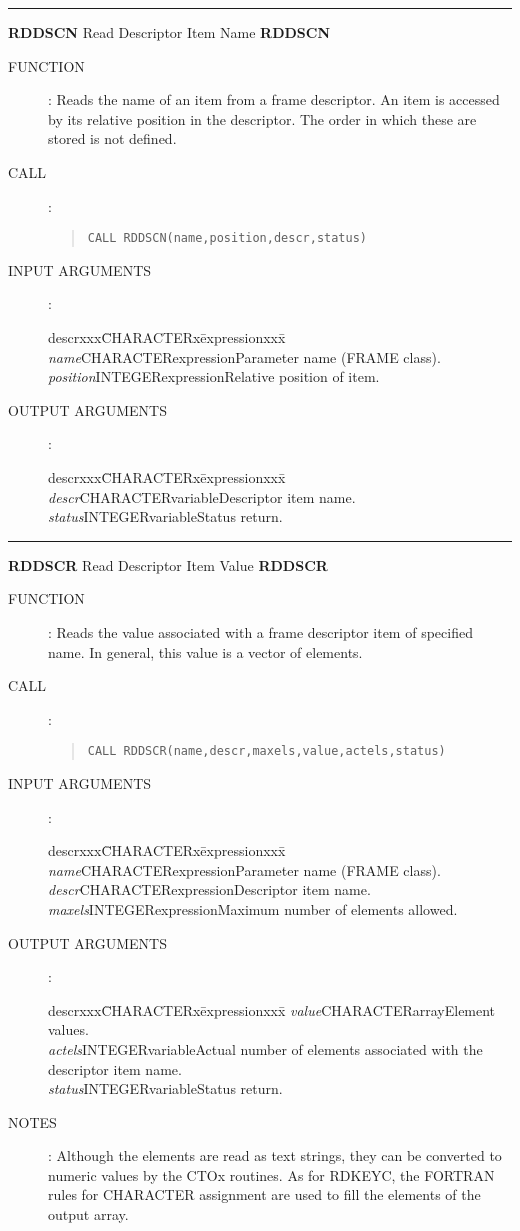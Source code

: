 \rule{\textwidth}{0.3mm}
{\Large {\bf RDDSCN} \hfill Read Descriptor Item Name \hfill {\bf RDDSCN}}
\begin{description}
\item [FUNCTION]:
Reads the name of an item from a frame descriptor.
An item is accessed by its relative position in the descriptor.
The order in which these are stored is not defined.
\item [CALL]:
\begin{quote}
{\tt CALL RDDSCN(name,position,descr,status)}
\end{quote}
\item [INPUT ARGUMENTS]:
\begin{tabbing}
descrxxx\=CHARACTERx\=expressionxxx\=\kill
{\em name}\>CHARACTER\>expression\>Parameter name (FRAME class).\\
{\em position}\>INTEGER\>expression\>Relative position of item.
\end{tabbing}
\item [OUTPUT ARGUMENTS]:
\begin{tabbing}
descrxxx\=CHARACTERx\=expressionxxx\=\kill
{\em descr}\>CHARACTER\>variable\>Descriptor item name.\\
{\em status}\>INTEGER\>variable\>Status return.
\end{tabbing}
\end{description}
\rule{\textwidth}{0.3mm}
{\Large {\bf RDDSCR} \hfill Read Descriptor Item Value \hfill {\bf RDDSCR}}
\begin{description}
\item [FUNCTION]:
Reads the value associated with a frame  descriptor item of specified name.
In general, this value is a vector of elements.
\item [CALL]:
\begin{quote}
{\tt CALL RDDSCR(name,descr,maxels,value,actels,status)}
\end{quote}
\item [INPUT ARGUMENTS]:
\begin{tabbing}
descrxxx\=CHARACTERx\=expressionxxx\=\kill
{\em name}\>CHARACTER\>expression\>Parameter name (FRAME class).\\
{\em descr}\>CHARACTER\>expression\>Descriptor item name.\\
{\em maxels}\>INTEGER\>expression\>Maximum number of elements allowed.
\end{tabbing}
\item [OUTPUT ARGUMENTS]:
\begin{tabbing}
descrxxx\=CHARACTERx\=expressionxxx\=\kill
{\em value}\>CHARACTER\>array\>Element values.\\
{\em actels}\>INTEGER\>variable\>Actual number of elements associated with the\\
\>\>\>descriptor item name.\\
{\em status}\>INTEGER\>variable\>Status return.
\end{tabbing}
\item [NOTES]:
Although the elements are read as text strings, they can be converted to
numeric values by the CTOx routines.
As for RDKEYC, the FORTRAN rules for CHARACTER assignment are used to fill the
elements of the output array.
\end{description}
